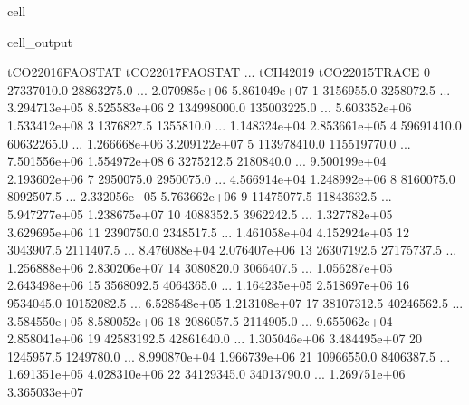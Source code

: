 \documentclass[letterpaper,10pt,english]{jupyterBook}
\begin{document}
\begin{sphinxuseclass}{cell}
\begin{sphinxVerbatimOutput}
\begin{sphinxuseclass}{cell_output}
\begin{sphinxVerbatim}[commandchars=\\\{\}]
    tCO2\PYGZus{}2016\PYGZus{}FAOSTAT  tCO2\PYGZus{}2017\PYGZus{}FAOSTAT  ...     tCH4\PYGZus{}2019  tCO2\PYGZus{}2015\PYGZus{}TRACE  \PYGZbs{}
0          27337010.0         28863275.0  ...  2.070985e+06     5.861049e+07   
1           3156955.0          3258072.5  ...  3.294713e+05     8.525583e+06   
2         134998000.0        135003225.0  ...  5.603352e+06     1.533412e+08   
3           1376827.5          1355810.0  ...  1.148324e+04     2.853661e+05   
4          59691410.0         60632265.0  ...  1.266668e+06     3.209122e+07   
5         113978410.0        115519770.0  ...  7.501556e+06     1.554972e+08   
6           3275212.5          2180840.0  ...  9.500199e+04     2.193602e+06   
7           2950075.0          2950075.0  ...  4.566914e+04     1.248992e+06   
8           8160075.0          8092507.5  ...  2.332056e+05     5.763662e+06   
9          11475077.5         11843632.5  ...  5.947277e+05     1.238675e+07   
10          4088352.5          3962242.5  ...  1.327782e+05     3.629695e+06   
11          2390750.0          2348517.5  ...  1.461058e+04     4.152924e+05   
12          3043907.5          2111407.5  ...  8.476088e+04     2.076407e+06   
13         26307192.5         27175737.5  ...  1.256888e+06     2.830206e+07   
14          3080820.0          3066407.5  ...  1.056287e+05     2.643498e+06   
15          3568092.5          4064365.0  ...  1.164235e+05     2.518697e+06   
16          9534045.0         10152082.5  ...  6.528548e+05     1.213108e+07   
17         38107312.5         40246562.5  ...  3.584550e+05     8.580052e+06   
18          2086057.5          2114905.0  ...  9.655062e+04     2.858041e+06   
19         42583192.5         42861640.0  ...  1.305046e+06     3.484495e+07   
20          1245957.5          1249780.0  ...  8.990870e+04     1.966739e+06   
21         10966550.0          8406387.5  ...  1.691351e+05     4.028310e+06   
22         34129345.0         34013790.0  ...  1.269751e+06     3.365033e+07   


\end{sphinxVerbatim}
\end{sphinxuseclass}
\end{sphinxVerbatimOutput}
\end{sphinxuseclass}
\end{document}
